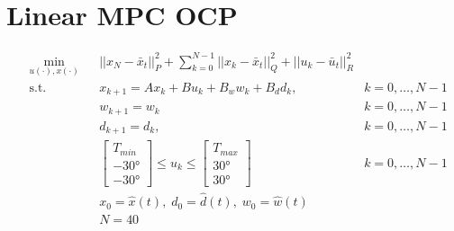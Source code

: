 \ETHslide
\section*{Linear MPC OCP}
\footnotesize{
\begin{align}
&\min_{u(\cdot),x(\cdot)}
& & ||x_N-\bar{x}_t||_P^2 + \sum_{k=0}^{N-1} ||x_k - \bar{x}_t||_Q^2 + ||u_k - \bar{u}_t||_R^2  \nonumber\\
& \text{s.t.} 
& & x_{k+1} = A x_k + B u_k + B_w w_k + B_d d_k, & k = 0, \ldots, N-1 \nonumber\\
& & & w_{k+1} = w_k  & k = 0, \ldots, N-1 \nonumber\\
& & & d_{k+1} = d_k, & k = 0, \ldots, N-1 \nonumber\\
& & & \begin{bmatrix}
T_{min} \\ -30\si{\degree} \\ -30\si{\degree}
\end{bmatrix} \leq u_k \leq \begin{bmatrix}
T_{max} \\ 30\si{\degree} \\ 30\si{\degree}
\end{bmatrix} & k = 0, \ldots, N-1 \nonumber\\
& & & x_0 = \hat x (t), \; d_0 = \hat d(t), \; w_0 = \hat w(t) \nonumber \\
& & & N=40 \nonumber
\end{align}
}
\normalsize{}
\clearpage